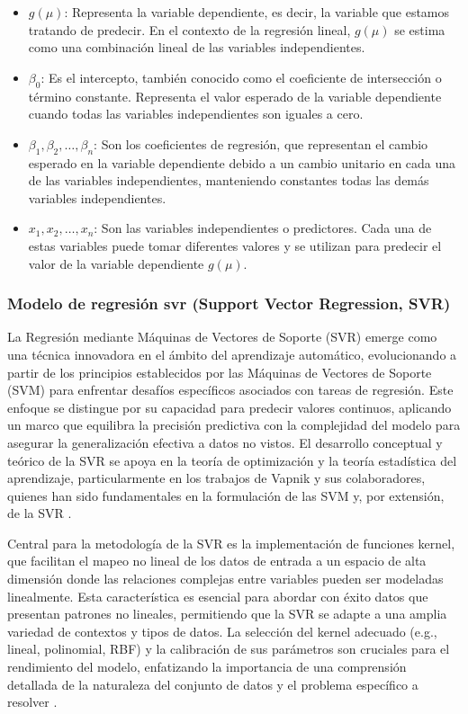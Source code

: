 \documentclass[
  11pt,
  bookmarksnumbered]{article}
\begin{document}
\begin{itemize}
\item
  \(g(\mu)\): Representa la variable dependiente, es decir, la variable que estamos tratando de predecir.
  En el contexto de la regresión lineal, \(g(\mu)\) se estima como una combinación lineal de las variables independientes.
\item
  \(\beta_0\): Es el intercepto, también conocido como el coeficiente de intersección o término constante.
  Representa el valor esperado de la variable dependiente cuando todas las variables independientes son iguales a cero.
\item
  \(\beta_1, \beta_2, \ldots, \beta_n\): Son los coeficientes de regresión, que representan el cambio esperado en la variable dependiente debido a un cambio unitario en cada una de las variables independientes, manteniendo constantes todas las demás variables independientes.
\item
  \(x_1, x_2, \ldots, x_n\): Son las variables independientes o predictores.
  Cada una de estas variables puede tomar diferentes valores y se utilizan para predecir el valor de la variable dependiente \(g(\mu)\).
\end{itemize}

\hypertarget{modelo-de-regresiuxf3n-svr-support-vector-regression-svr}{%
\subsubsection{Modelo de regresión svr (Support Vector Regression, SVR)}\label{modelo-de-regresiuxf3n-svr-support-vector-regression-svr}}

La Regresión mediante Máquinas de Vectores de Soporte (SVR) emerge como una técnica innovadora en el ámbito del aprendizaje automático, evolucionando a partir de los principios establecidos por las Máquinas de Vectores de Soporte (SVM) para enfrentar desafíos específicos asociados con tareas de regresión.
Este enfoque se distingue por su capacidad para predecir valores continuos, aplicando un marco que equilibra la precisión predictiva con la complejidad del modelo para asegurar la generalización efectiva a datos no vistos.
El desarrollo conceptual y teórico de la SVR se apoya en la teoría de optimización y la teoría estadística del aprendizaje, particularmente en los trabajos de Vapnik y sus colaboradores, quienes han sido fundamentales en la formulación de las SVM y, por extensión, de la SVR \textcite{Vapnik1995}.

Central para la metodología de la SVR es la implementación de funciones kernel, que facilitan el mapeo no lineal de los datos de entrada a un espacio de alta dimensión donde las relaciones complejas entre variables pueden ser modeladas linealmente.
Esta característica es esencial para abordar con éxito datos que presentan patrones no lineales, permitiendo que la SVR se adapte a una amplia variedad de contextos y tipos de datos.
La selección del kernel adecuado (e.g., lineal, polinomial, RBF) y la calibración de sus parámetros son cruciales para el rendimiento del modelo, enfatizando la importancia de una comprensión detallada de la naturaleza del conjunto de datos y el problema específico a resolver \textcite{ScholkopfSmola2002}.
\end{document}
